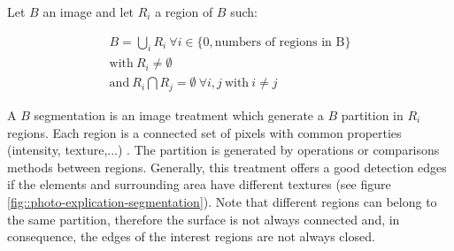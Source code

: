 \documentclass[12pt]{iopart}
\begin{document}
Let $B$ an image and let $R_{i}$ a region of $B$ such:

\begin{eqnarray}
B = \bigcup_{i}R_{i}\ \forall i \in \{0, \mbox{numbers of regions in B}\} \\
\mbox{with}\ R_{i} \neq \emptyset \\
\mbox{and}\  R_{i}\bigcap R_{j} = \emptyset\ \forall i, j\ \mbox{with}\ i \neq j\ 
\label{equation-segmentation}
\end{eqnarray}

A $B$ segmentation is an image treatment which generate a $B$ partition in $R_{i}$ regions. 
Each region is a connected set of pixels with 
common properties (intensity, texture,...) \cite{COCQUEREZ}.
 The partition is generated by operations or comparisons methods between 
regions. Generally, this treatment offers a good detection edges if
 the elements and surrounding area have different textures (see figure
 \ref{fig::photo-explication-segmentation}). 
Note that different regions can belong to the same partition,
 therefore the surface is not always connected and,
 in consequence, the edges of the interest regions are not always closed.
\end{document}
